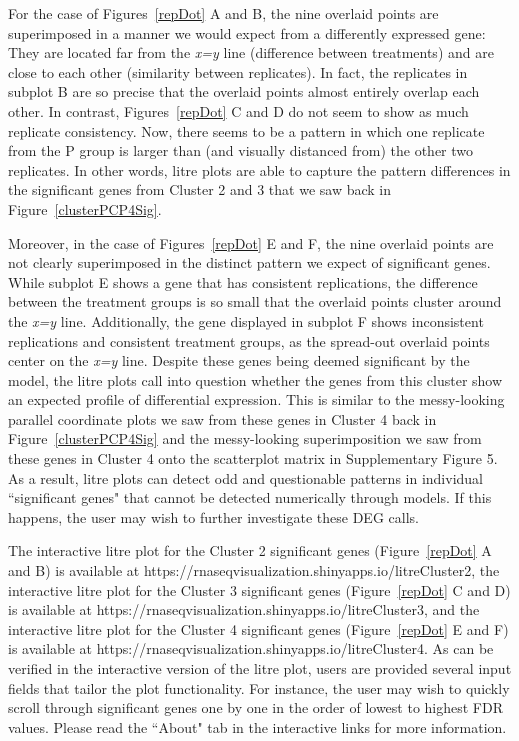 \documentclass{bioinfo}
\begin{document}
For the case of Figures~\ref{repDot} A and B, the nine overlaid points are superimposed in a manner we would expect from a differently expressed gene: They are located far from the \textit{x=y} line (difference between treatments) and are close to each other (similarity between replicates). In fact, the replicates in subplot B are so precise that the overlaid points almost entirely overlap each other. In contrast, Figures~\ref{repDot} C and D do not seem to show as much replicate consistency. Now, there seems to be a pattern in which one replicate from the P group is larger than (and visually distanced from) the other two replicates. In other words, litre plots are able to capture the pattern differences in the significant genes from Cluster 2 and 3 that we saw back in Figure~\ref{clusterPCP4Sig}.

Moreover, in the case of Figures~\ref{repDot} E and F, the nine overlaid points are not clearly superimposed in the distinct pattern we expect of significant genes. While subplot E shows a gene that has consistent replications, the difference between the treatment groups is so small that the overlaid points cluster around the \textit{x=y} line. Additionally, the gene displayed in subplot F shows inconsistent replications and consistent treatment groups, as the spread-out overlaid points center on the \textit{x=y} line. Despite these genes being deemed significant by the model, the litre plots call into question whether the genes from this cluster show an expected profile of differential expression. This is similar to the messy-looking parallel coordinate plots we saw from these genes in Cluster 4 back in Figure~\ref{clusterPCP4Sig} and the messy-looking superimposition we saw from these genes in Cluster 4 onto the scatterplot matrix in Supplementary Figure 5. As a result, litre plots can detect odd and questionable patterns in individual ``significant genes" that cannot be detected numerically through models. If this happens, the user may wish to further investigate these DEG calls.

The interactive litre plot for the Cluster 2 significant genes (Figure~\ref{repDot} A and B) is available at https://rnaseqvisualization.shinyapps.io/litreCluster2, the interactive litre plot for the Cluster 3 significant genes (Figure~\ref{repDot} C and D) is available at https://rnaseqvisualization.shinyapps.io/litreCluster3, and the interactive litre plot for the Cluster 4 significant genes (Figure~\ref{repDot} E and F) is available at https://rnaseqvisualization.shinyapps.io/litreCluster4. As can be verified in the interactive version of the litre plot, users are provided several input fields that tailor the plot functionality. For instance, the user may wish to quickly scroll through significant genes one by one in the order of lowest to highest FDR values. Please read the ``About" tab in the interactive links for more information.
\end{document}
